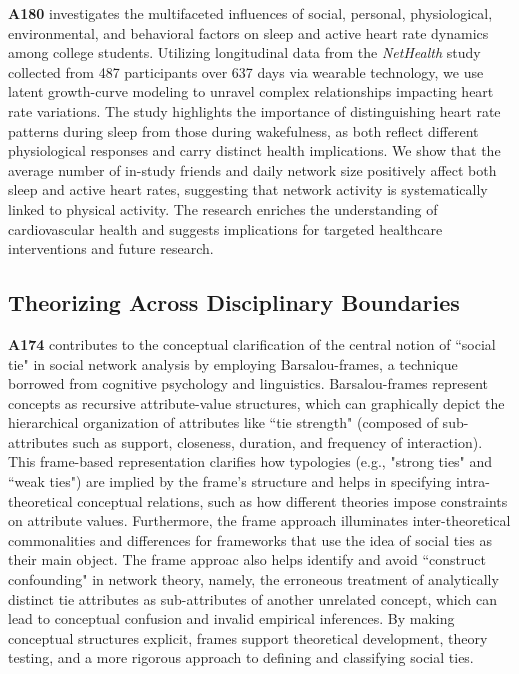 \documentclass[a4paper,11pt]{extarticle}
\begin{document}
\textbf{A180} investigates the multifaceted influences of social, personal, physiological, environmental, and behavioral factors on sleep and active heart rate dynamics among college students. Utilizing longitudinal data from the \textit{NetHealth} study collected from 487 participants over 637 days via wearable technology, we use latent growth-curve modeling to unravel complex relationships impacting heart rate variations. The study highlights the importance of distinguishing heart rate patterns during sleep from those during wakefulness, as both reflect different physiological responses and carry distinct health implications. We show that the average number of in-study friends and daily network size positively affect both sleep and active heart rates, suggesting that network activity is systematically linked to physical activity. The research enriches the understanding of cardiovascular health and suggests implications for targeted healthcare interventions and future research.

\subsection*{Theorizing Across Disciplinary Boundaries}

\textbf{A174} contributes to the conceptual clarification of the central notion of ``social tie" in social network analysis by employing Barsalou-frames, a technique borrowed from cognitive psychology and linguistics. Barsalou-frames represent concepts as recursive attribute-value structures, which can graphically depict the hierarchical organization of attributes like ``tie strength" (composed of sub-attributes such as support, closeness, duration, and frequency of interaction). This frame-based representation clarifies how typologies (e.g., "strong ties" and ``weak ties") are implied by the frame's structure and helps in specifying intra-theoretical conceptual relations, such as how different theories impose constraints on attribute values. Furthermore, the frame approach illuminates inter-theoretical commonalities and differences for frameworks that use the idea of social ties as their main object. The frame approac  also helps identify and avoid ``construct confounding" in network theory, namely, the erroneous treatment of analytically distinct tie attributes as sub-attributes of another unrelated concept, which can lead to conceptual confusion and invalid empirical inferences. By making conceptual structures explicit, frames support theoretical development, theory testing, and a more rigorous approach to defining and classifying social ties.
\end{document}
